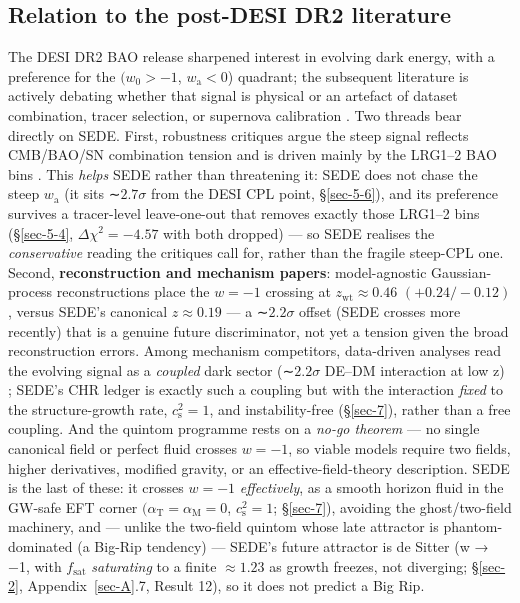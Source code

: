 \documentclass[preprint,12pt]{elsarticle}
\begin{document}
\subsection{Relation to the post-DESI DR2 literature}\label{sec-5-7}

The DESI DR2 BAO release \citep{DESI:2025zgx} sharpened interest in
evolving dark energy, with a preference for the \((w_{0} > -1\),
\(w_{\mathrm{a}} < 0\)) quadrant; the subsequent literature is actively
debating whether that signal is physical or an artefact of dataset
combination, tracer selection, or supernova calibration
\citep{Turyshev:2026ewm}. Two threads bear directly on SEDE. First,
robustness critiques argue the steep signal reflects CMB/BAO/SN
combination tension \citep{Wang:2025bkk} and is driven mainly by the
LRG1--2 BAO bins \citep{Chaudhary:2025vzy, Liu:2024gfy}. This
\emph{helps} SEDE rather than threatening it: SEDE does not chase the
steep \(w_{\mathrm{a}}\) (it sits ∼\(2.7\sigma\) from the DESI CPL
point, §\ref{sec-5-6}), and its preference survives a tracer-level
leave-one-out that removes exactly those LRG1--2 bins (§\ref{sec-5-4},
\(\Delta \chi ^{2} = -4.57\) with both dropped) --- so SEDE realises the
\emph{conservative} reading the critiques call for, rather than the
fragile steep-CPL one. Second, \textbf{reconstruction and mechanism
papers}: model-agnostic Gaussian-process reconstructions place the
\(w = -1\) crossing at \(z_{\mathrm{wt}} \approx  0.46\)
\((+0.24/-0.12)\) \citep{Zhang:2025bmk}, versus SEDE's canonical
\(z \approx  0.19\) --- a ∼\(2.2\sigma\) offset (SEDE crosses more
recently) that is a genuine future discriminator, not yet a tension
given the broad reconstruction errors. Among mechanism competitors,
data-driven analyses read the evolving signal as a \emph{coupled} dark
sector (∼\(2.2\sigma\) DE--DM interaction at low z) \citep{You:2025uon};
SEDE's CHR ledger is exactly such a coupling but with the interaction
\emph{fixed} to the structure-growth rate, \(c_{\mathrm{s}}^{2} = 1\),
and instability-free (§\ref{sec-7}), rather than a free coupling. And
the quintom programme \citep{Cai:2025mas, Thanankullaphong:2026anl}
rests on a \emph{no-go theorem} --- no single canonical field or perfect
fluid crosses \(w = -1\), so viable models require two fields, higher
derivatives, modified gravity, or an effective-field-theory description.
SEDE is the last of these: it crosses \(w = -1\) \emph{effectively}, as
a smooth horizon fluid in the GW-safe EFT corner
\((\alpha _{\mathrm{T}} = \alpha _{\mathrm{M}} = 0\),
\(c_{\mathrm{s}}^{2} = 1\); §\ref{sec-7}), avoiding the ghost/two-field
machinery, and --- unlike the two-field quintom whose late attractor is
phantom-dominated (a Big-Rip tendency) \citep{Thanankullaphong:2026anl}
--- SEDE's future attractor is de Sitter (w → −1, with
\(f_{\mathrm{sat}}\) \emph{saturating} to a finite \(\approx 1.23\) as
growth freezes, not diverging; §\ref{sec-2}, Appendix~\ref{sec-A}.7,
Result 12), so it does not predict a Big Rip.
\end{document}
